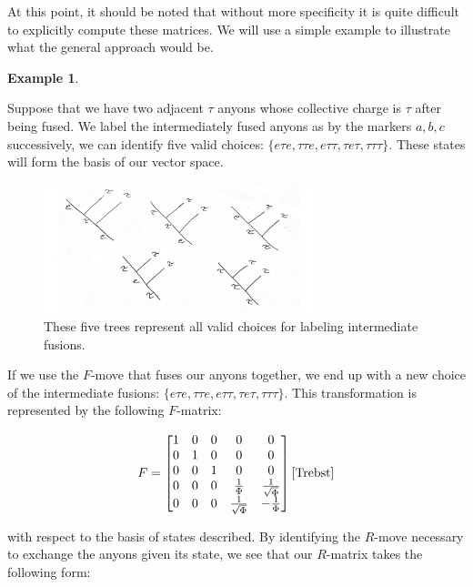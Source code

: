\documentclass[10pt]{ucthesis}
\newtheorem{example}[definition]{Example}
\begin{document}
At this point, it should be noted that without more specificity it is quite difficult to explicitly compute these matrices. We will use a simple example to illustrate what the general approach would be.

\begin{example}
\end{example}
Suppose that we have two adjacent $\tau$ anyons whose collective charge is $\tau$ after being fused. We label the intermediately fused anyons as by the markers $a,b,c$ successively, we can identify five valid choices: $\{e\tau e,\tau\tau e, e\tau\tau, \tau e\tau, \tau\tau\tau\}$. These states will form the basis of our vector space.

\begin{figure}[H]
	\centering
	\includegraphics[width=0.7\textwidth]{fivetrees.png}
	\caption{These five trees represent all valid choices for labeling intermediate fusions.}
\end{figure}

If we use the $F$-move that fuses our anyons together, we end up with a new choice of the intermediate fusions: $\{e\tau e,\tau\tau e, e\tau\tau, \tau e\tau, \tau\tau\tau\}$. This transformation is represented by the following $F$-matrix:

\begin{equation}
	\begin{aligned}
		F = \begin{bmatrix}
				1 & 0 & 0 & 0 & 0 \\
				0 & 1 & 0 & 0 & 0 \\
				0 & 0 & 1 & 0 & 0 \\
				0 & 0 & 0 & \frac{1}{\Phi} & \frac{1}{\sqrt{\Phi}}\\
				0 & 0 & 0 &\frac{1}{\sqrt{\Phi}} & -\frac{1}{\Phi}
			\end{bmatrix}\cite{Trebst}
	\end{aligned}
\end{equation}

with respect to the basis of states described. By identifying the $R$-move necessary to exchange the anyons given its state, we see that our $R$-matrix takes the following form:
\end{document}
